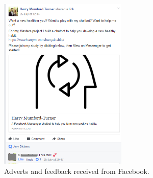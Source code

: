 \begin{figure}[H]
  \hspace{10px}
  \includegraphics[width=2.4in]{resources/feedback/adverts/hacksoc-post.png}
  \caption{Adverts and feedback received from Facebook.}
\end{figure}
